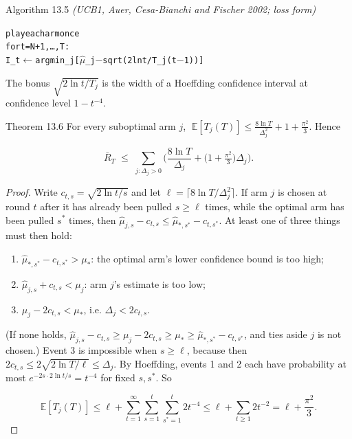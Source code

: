 \documentclass[11pt,a4paper,openany]{book}
\newcommand{\E}{\mathbb{E}}
\newenvironment{algo}{\par\smallskip\begingroup\footnotesize\begin{alltt}}{\end{alltt}\endgroup\smallskip}
\begin{document}
\begin{balg}{Algorithm 13.5 \emph{(UCB1, Auer, Cesa-Bianchi and Fischer 2002; loss form)}}
\begin{algo}
play each arm once
for t = N+1, …, T:
    I\_t \ensuremath{\leftarrow} argmin\_j  [ \ensuremath{\hat{\mu}}\_j \ensuremath{-} sqrt( 2 ln t / T\_j(t\ensuremath{-}1) ) ]
\end{algo}

The bonus $\sqrt{2\ln t/T_j}$ is the width of a Hoeffding confidence interval at confidence level $1-t^{-4}$.
\end{balg}

\begin{bthm}{Theorem 13.6}
For every suboptimal arm $j$, $\;\E[T_j(T)]\le\frac{8\ln T}{\Delta_j^2}+1+\frac{\pi^2}3$. Hence

\[\bar R_T\;\le\;\sum_{j:\Delta_j>0}\Big(\frac{8\ln T}{\Delta_j}+\big(1+\tfrac{\pi^2}{3}\big)\Delta_j\Big).\]

\end{bthm}

\begin{proof}
Write $c_{t,s}=\sqrt{2\ln t/s}$ and let $\ell=\lceil8\ln T/\Delta_j^2\rceil$. If arm $j$ is chosen at round $t$ after it has already been pulled $s\ge\ell$ times, while the optimal arm has been pulled $s^*$ times, then $\hat\mu_{j,s}-c_{t,s}\le\hat\mu_{*,s^*}-c_{t,s^*}$. At least one of three things must then hold:

\begin{enumerate}
\item $\hat\mu_{*,s^*}-c_{t,s^*}>\mu_*$: the optimal arm's lower confidence bound is too high;
\item $\hat\mu_{j,s}+c_{t,s}<\mu_j$: arm $j$'s estimate is too low;
\item $\mu_j-2c_{t,s}<\mu_*$, i.e. $\Delta_j<2c_{t,s}$.
\end{enumerate}

(If none holds, $\hat\mu_{j,s}-c_{t,s}\ge\mu_j-2c_{t,s}\ge\mu_*\ge\hat\mu_{*,s^*}-c_{t,s^*}$, and ties aside $j$ is not chosen.) Event 3 is impossible when $s\ge\ell$, because then $2c_{t,s}\le2\sqrt{2\ln T/\ell}\le\Delta_j$. By Hoeffding, events 1 and 2 each have probability at most $e^{-2s\cdot2\ln t/s}=t^{-4}$ for fixed $s,s^*$. So

\[\E[T_j(T)]\le\ell+\sum_{t=1}^\infty\sum_{s=1}^{t}\sum_{s^*=1}^{t}2t^{-4}\le\ell+\sum_{t\ge1}2t^{-2}=\ell+\frac{\pi^2}3.\]

\end{proof}
\end{document}
